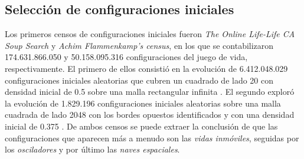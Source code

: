 \documentclass[../proyecto.tex]{memoir}
\begin{document}
\subsection{Selección de configuraciones iniciales} \label{seleccion}

Los primeros censos de configuraciones iniciales fueron \textit{The Online Life-Life CA Soup Search} y \textit{Achim Flammenkamp's census}, en los que se contabilizaron 174.631.866.050 y 50.158.095.316 configuraciones del juego de vida, respectivamente. El primero de ellos consistió en la evolución de 6.412.048.029 configuraciones iniciales aleatorias que cubren un cuadrado de lado 20 con densidad inicial de 0.5 sobre una malla rectangular infinita \cite{sopa1}. El segundo exploró la evolución de 1.829.196 configuraciones iniciales aleatorias sobre una malla cuadrada de lado 2048 con los bordes opuestos identificados y con una densidad inicial de 0.375 \cite{sopa2}. De ambos censos se puede extraer la conclusión de que las configuraciones que aparecen más a menudo son las \textit{vidas inmóviles}, seguidas por los \textit{osciladores} y por último las \textit{naves espaciales}.
\end{document}
